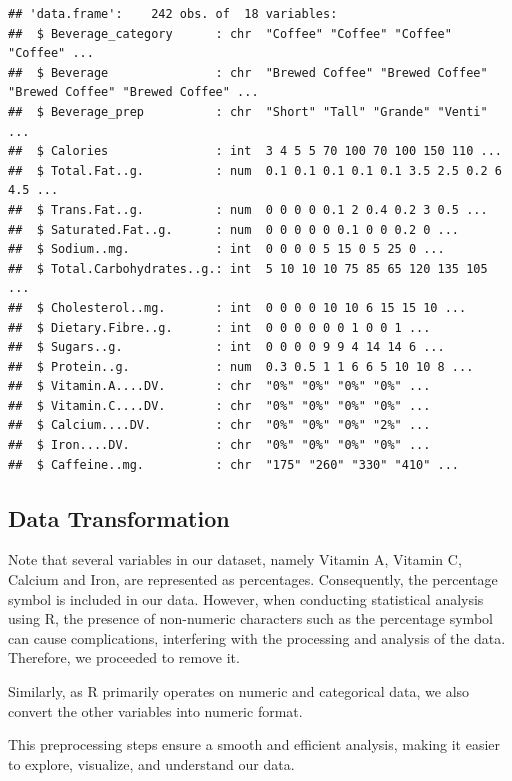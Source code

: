 \documentclass[
]{article}
\begin{document}
\begin{verbatim}
## 'data.frame':    242 obs. of  18 variables:
##  $ Beverage_category      : chr  "Coffee" "Coffee" "Coffee" "Coffee" ...
##  $ Beverage               : chr  "Brewed Coffee" "Brewed Coffee" "Brewed Coffee" "Brewed Coffee" ...
##  $ Beverage_prep          : chr  "Short" "Tall" "Grande" "Venti" ...
##  $ Calories               : int  3 4 5 5 70 100 70 100 150 110 ...
##  $ Total.Fat..g.          : num  0.1 0.1 0.1 0.1 0.1 3.5 2.5 0.2 6 4.5 ...
##  $ Trans.Fat..g.          : num  0 0 0 0 0.1 2 0.4 0.2 3 0.5 ...
##  $ Saturated.Fat..g.      : num  0 0 0 0 0 0.1 0 0 0.2 0 ...
##  $ Sodium..mg.            : int  0 0 0 0 5 15 0 5 25 0 ...
##  $ Total.Carbohydrates..g.: int  5 10 10 10 75 85 65 120 135 105 ...
##  $ Cholesterol..mg.       : int  0 0 0 0 10 10 6 15 15 10 ...
##  $ Dietary.Fibre..g.      : int  0 0 0 0 0 0 1 0 0 1 ...
##  $ Sugars..g.             : int  0 0 0 0 9 9 4 14 14 6 ...
##  $ Protein..g.            : num  0.3 0.5 1 1 6 6 5 10 10 8 ...
##  $ Vitamin.A....DV.       : chr  "0%" "0%" "0%" "0%" ...
##  $ Vitamin.C....DV.       : chr  "0%" "0%" "0%" "0%" ...
##  $ Calcium....DV.         : chr  "0%" "0%" "0%" "2%" ...
##  $ Iron....DV.            : chr  "0%" "0%" "0%" "0%" ...
##  $ Caffeine..mg.          : chr  "175" "260" "330" "410" ...
\end{verbatim}

\hypertarget{data-transformation}{%
\subsection{Data Transformation}\label{data-transformation}}

Note that several variables in our dataset, namely Vitamin A, Vitamin C,
Calcium and Iron, are represented as percentages. Consequently, the
percentage symbol is included in our data. However, when conducting
statistical analysis using R, the presence of non-numeric characters
such as the percentage symbol can cause complications, interfering with
the processing and analysis of the data. Therefore, we proceeded to
remove it.

Similarly, as R primarily operates on numeric and categorical data, we
also convert the other variables into numeric format.

This preprocessing steps ensure a smooth and efficient analysis, making
it easier to explore, visualize, and understand our data.
\end{document}
